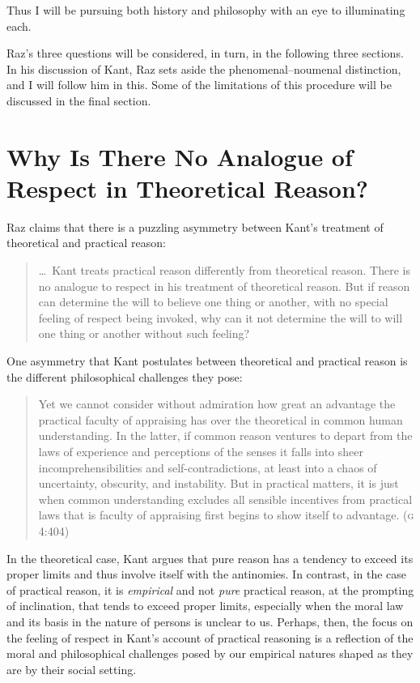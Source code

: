 \documentclass[a4paper,12pt]{article}
\begin{document}
Thus I will be pursuing both history and philosophy with an eye to illuminating each.

Raz's three questions will be considered, in turn, in the following three sections. In his discussion of Kant, Raz sets aside the phenomenal--noumenal distinction, and I will follow him in this. Some of the limitations of this procedure will be discussed in the final section.


\section{Why Is There No Analogue of Respect in Theoretical Reason?} \label{sec:why_is_there_no_analogue_of_respect_in_theoretical_reason} %

Raz claims that there is a puzzling asymmetry between Kant's treatment of theoretical and practical reason: 
\begin{quote}
	\ldots\ Kant treats practical reason differently from theoretical reason. There is no analogue to respect in his treatment of theoretical reason. But if reason can determine the will to believe one thing or another, with no special feeling of respect being invoked, why can it not determine the will to will one thing or another without such feeling? \citep[132--3]{Raz:2001ps} 
\end{quote}

One asymmetry that Kant postulates between theoretical and practical reason is the different philosophical challenges they pose: 
\begin{quote}
    Yet we cannot consider without admiration how great an advantage the practical faculty of appraising has over the theoretical in common human understanding. In the latter, if common reason ventures to depart from the laws of experience and perceptions of the senses it falls into sheer incomprehensibilities and self-contradictions, at least into a chaos of uncertainty, obscurity, and instability. But in practical matters, it is just when common understanding excludes all sensible incentives from practical laws that is faculty of appraising first begins to show itself to advantage. (\textsc{g} 4:404)
\end{quote}
In the theoretical case, Kant argues that pure reason has a tendency to exceed its proper limits and thus involve itself with the antinomies. In contrast, in the case of practical reason, it is \emph{empirical} and not \emph{pure} practical reason, at the prompting of inclination, that tends to exceed proper limits, especially when the moral law and its basis in the nature of persons is unclear to us. Perhaps, then, the focus on the feeling of respect in Kant's account of practical reasoning is a reflection of the moral and philosophical challenges posed by our empirical natures shaped as they are by their social setting. 
\end{document}
